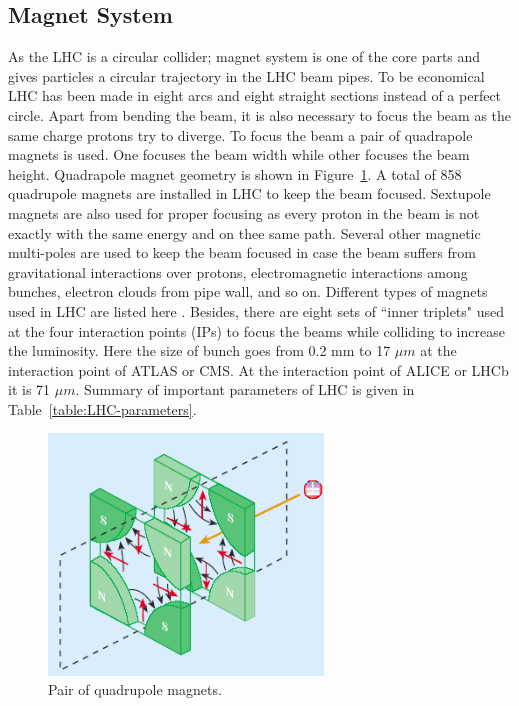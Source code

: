 \subsection{Magnet System}
As the LHC is a circular collider; magnet system is one of the core parts and gives particles a circular trajectory in the LHC beam pipes. To be economical LHC has been made in eight arcs and eight straight sections instead of a perfect circle. Apart from bending the beam, it is also necessary to focus the beam as the same charge protons try to diverge. To focus the beam a pair of quadrapole magnets is used. One focuses the beam width while other focuses the beam height. Quadrapole magnet geometry is shown in Figure~\ref{fig:QuadrupoleMagnet}. A total of 858 quadrupole magnets are installed in LHC to keep the beam focused. Sextupole magnets are also used for proper focusing as every proton in the beam is not exactly with the same energy and on thee same path. Several other magnetic multi-poles are used to keep the beam focused  in case the beam suffers from gravitational interactions over protons, electromagnetic interactions among bunches, electron clouds from pipe wall, and so on. Different types of magnets used in LHC are listed here \cite{WebLink:LHC_magnets}. Besides, there are eight sets of ``inner triplets" used at the four interaction points (IPs) to focus the beams while colliding to increase the luminosity. Here the size of bunch goes from 0.2 mm to 17 $\mu m$ at the interaction point of ATLAS or CMS. At the interaction point of ALICE or LHCb it is 71 $\mu m$. Summary of important parameters of LHC is given in Table~\ref{table:LHC-parameters}.
\begin{figure}[!htbp]
	\centering
	\includegraphics[width=0.65\textwidth]{figures/LHC/quadrupole_magnet_pair.png}
	\caption{Pair of quadrupole magnets.}
	\label{fig:QuadrupoleMagnet}
\end{figure}



